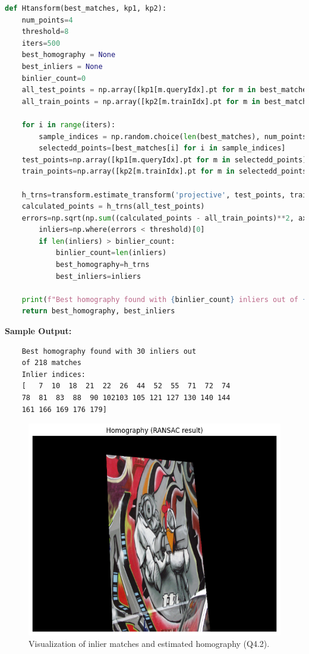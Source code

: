 \documentclass[10pt,a4paper,twocolumn]{article}
\begin{document}
\begin{lstlisting}[language=Python, style=mystyle]
def Htansform(best_matches, kp1, kp2):
    num_points=4
    threshold=8
    iters=500
    best_homography = None
    best_inliers = None
    binlier_count=0
    all_test_points = np.array([kp1[m.queryIdx].pt for m in best_matches])
    all_train_points = np.array([kp2[m.trainIdx].pt for m in best_matches])

    for i in range(iters):
        sample_indices = np.random.choice(len(best_matches), num_points, replace=False)
        selectedd_points=[best_matches[i] for i in sample_indices]
    test_points=np.array([kp1[m.queryIdx].pt for m in selectedd_points])
    train_points=np.array([kp2[m.trainIdx].pt for m in selectedd_points])

    h_trns=transform.estimate_transform('projective', test_points, train_points)
    calculated_points = h_trns(all_test_points)
    errors=np.sqrt(np.sum((calculated_points - all_train_points)**2, axis=1))
        inliers=np.where(errors < threshold)[0]
        if len(inliers) > binlier_count:
            binlier_count=len(inliers)
            best_homography=h_trns
            best_inliers=inliers

    print(f"Best homography found with {binlier_count} inliers out of {len(best_matches)} matches")
    return best_homography, best_inliers
\end{lstlisting}
\vspace{2pt}
	\textbf{Sample Output:}
    \begin{verbatim}
    Best homography found with 30 inliers out 
    of 218 matches
    Inlier indices:
    [   7  10  18  21  22  26  44  52  55  71  72  74
    78  81  83  88  90 102103 105 121 127 130 140 144 
    161 166 169 176 179]
    \end{verbatim}
\begin{figure}[H]
    \centering
    \includegraphics[width=0.95\columnwidth]{fig/4.2.png}
    \caption{Visualization of inlier matches and estimated homography (Q4.2).}
    \label{fig:q4_2}
\end{figure}
\end{document}
